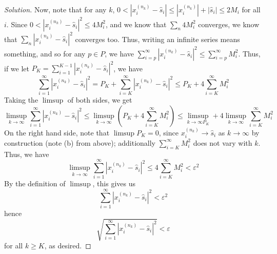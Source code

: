 \documentclass{article}
\newcommand{\ep}{{\varepsilon}}
\begin{document}
\begin{proof}[Solution]
	Now, note that for any $k$,
	$0 < |x^{(n_k)}_i - \hat{s}_i| \leq |x^{(n_k)}_i| + |\hat{s}_i| \leq 2M_i$
	for all $i$.
	Since $0 < |x^{(n_k)}_i - \hat{s}_i|^2 \leq 4M_i^2$,
	and we know that $\sum_n 4M_i^2$ converges,
	we know that $\sum_n|x^{(n_k)}_i - \hat{s}_i|^2$ converges too.
	Thus, writing an infinite series means something,
	and so for any $p \in P$,
	we have $\sum_{i=p}^\infty|x^{(n_k)}_i - \hat{s}_i|^2 \leq
	\sum_{i=p}^\infty M_i^2$.
	Thus, if we let $P_K = \sum_{i=1}^{K-1}|x^{(n_k)}_i - \hat{s}_i|^2$,
	we have
	\[
		\sum_{i=1}^\infty |x^{(n_k)}_i - \hat{s}_i|^2
		= P_K + \sum_{i=K}^\infty |x^{(n_k)}_i - \hat{s}_i|^2
		\leq P_K + 4\sum_{i=K}^\infty M_i^2
	\]
	Taking the $\limsup$ of both sides, we get
	\[
		\limsup_{k\to\infty} \sum_{i=1}^\infty |x^{(n_k)}_i - \hat{s}_i|^2
		\leq \limsup_{k\to\infty}\left(P_K + 4\sum_{i=K}^\infty M_i^2\right)
		\leq \limsup_{k\to\infty P_K} + 4\limsup_{k\to\infty}\sum_{i=K}^\infty M_i^2
	\]
	On the right hand side, note that $\limsup P_K = 0$,
	since $x^{(n_k)}_i \to \hat{s}_i$ as $k \to \infty$ by construction
	(note (b) from above);
	additionally $\sum_{i=K}^\infty M_i^2$ does not vary with $k$.
	Thus, we have
	\[
		\limsup_{k\to\infty} \sum_{i=1}^\infty |x^{(n_k)}_i - \hat{s}_i|^2
		\leq 4\sum_{i=K}^\infty M_i^2 < \ep^2
	\]
	By the definition of $\limsup$, this gives us
	\[
		\sum_{i=1}^\infty |x^{(n_k)}_i - \hat{s}_i|^2 < \ep^2
	\]
	hence
	\[
		\sqrt{\sum_{i=1}^\infty |x^{(n_k)}_i - \hat{s}_i|^2} < \ep
	\]
	for all $k \geq K$, as desired.
\end{proof}
\clearpage
\end{document}
